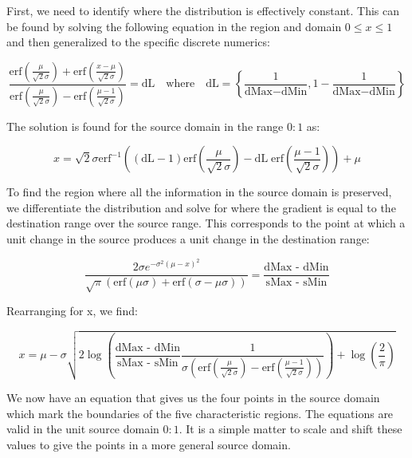 First, we need to identify where the distribution is effectively constant. This can be found by solving the following equation in the region and domain $0 \le x \le 1$ and then generalized to the specific discrete numerics:

\begin{equation}\label{eq:0to1}
 \frac{\text{erf}\left(\frac{\mu }{\sqrt{2} \sigma }\right)+\text{erf}\left(\frac{x-\mu }{\sqrt{2} \sigma }\right)}{\text{erf}\left(\frac{\mu }{\sqrt{2} \sigma }\right)-\text{erf}\left(\frac{\mu -1}{\sqrt{2} \sigma }\right)}=\text{dL} \quad \text{where} \quad \text{dL} = \left\{ \frac{1}{\text{dMax} - \text{dMin}}, 1 - \frac{1}{\text{dMax} - \text{dMin}} \right\}
\end{equation}


The solution is found for the source domain in the range $0:1$ as:


\begin{equation}\label{eq:LowHigh}
 x = \sqrt{2} \sigma  \text{erf}^{-1}\left((\text{dL}-1) \text{erf}\left(\frac{\mu }{\sqrt{2} \sigma }\right)-\text{dL} \; \text{erf}\left(\frac{\mu -1}{\sqrt{2} \sigma }\right)\right)+\mu
\end{equation}

To find the region where all the information in the source domain is preserved, we differentiate the distribution and solve for where the gradient is equal to the destination range over the source range. This corresponds to the point at which a unit change in the source produces a unit change in the destination range:

\begin{equation}\label{eq:Boundaries}
\frac{2 \sigma e^{-\sigma^2 (\mu-x)^2}}{\sqrt{\pi } (\text{erf}(\mu \sigma)+\text{erf}(\sigma-\mu \sigma))}=\frac{\text{dMax - dMin}}{\text{sMax - sMin}}
\end{equation}

Rearranging for x, we find:

\begin{equation}\label{eq:PreservedRegion}
 x=\mu -\sigma  \sqrt{2 \log \left( \frac{\text{dMax - dMin}}{\text{sMax - sMin}} \frac{1}{ \sigma  \left(\text{erf}\left(\frac{\mu }{\sqrt{2} \sigma }\right)-\text{erf}\left(\frac{\mu -1}{\sqrt{2} \sigma }\right)\right)}\right)+\log \left(\frac{2}{\pi }\right)}
\end{equation}

We now have an equation that gives us the four points in the source domain which mark the boundaries of the five characteristic regions. The equations are valid in the unit source domain $0:1$. It is a simple matter to scale and shift these values to give the points in a more general source domain.


